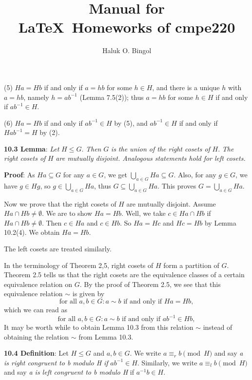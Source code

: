 \documentclass[11pt]{amsbook}
\title{
	Manual for\\
	\LaTeX\ Homeworks of cmpe220\\
	{\footnotesize \hbTimeStamp}
}
\author{Haluk O. Bingol}
\date{}                                           %
\begin{document}

(5) $Ha=Hb$ if and only if $a = hb$ for some $h \in H$, and there is a unique $h$ with $a=hb$, namely $h=ab^{-1}$ (Lemma 7.5(2)); thus $a=hb$ for some $h \in H$ if and only if $ab^{-1} \in H$. \par

(6)  $Ha=Hb$ if and only if $ab^{-1} \in H$ by (5), and $ab^{-1} \in H$ if and only if $Hab^{-1} = H$ by (2).\par

\textbf{10.3 Lemma}: \textit{Let} $H \leqslant G$. \textit{Then} $G$ \textit{is the union of the right cosets of} $H$. \textit{The right cosets of} $H$ \textit{are mutually disjoint. Analogous statements hold for left cosets.}\par
\textbf{Proof}: As $Ha\subseteq G$ for any $a \in G$, we get $\bigcup_{a \in G} Ha\subseteq G$. Also, for any $g \in G$, we have $g \in Hg$, so $g \in \bigcup_{a \in G} Ha$, thus $G \subseteq \bigcup_{a \in G} Ha$. This proves $G = \bigcup_{a \in G} Ha$. \par
Now we prove that the right cosets of $H$ are mutually disjoint. Assume $Ha \cap  Hb \neq \emptyset$. We are to show $Ha=Hb$. Well, we take $c \in Ha \cap  Hb $ if $Ha \cap  Hb \neq \emptyset$. Then $c \in Ha$ and $c \in Hb$. So $Ha=Hc$ and $Hc=Hb$ by Lemma 10.2(4). We obtain $Ha=Hb$. \par
The left cosets are treated similarly. \par
In the terminology of Theorem 2,5, right cosets of $H$ form a partition of $G$. Theorem 2.5 tells us that the right cosets are the equivalence classes of a certain equivalence relation on $G$. By the proof of Theorem 2.5, we see that this equivalence relation $\sim$ is given by 
\[ \text{for all } a,b \in G: a \sim b \text{ if and only if } Ha = Hb,\]
which we can read as
\[ \text{for all } a,b \in G: a \sim b \text{ if and only if } ab^{-1} \in Hb,\]
It may be worth while to obtain Lemma 10.3 from this relation $\sim$ instead of obtaining the relation $\sim$ from Lemma 10.3.\par
\textbf{10.4 Definition}: Let $H \leqslant G$ and $a,b \in G$. We write $a \equiv_r b \pmod{H}$ and say \textit{a is right congruent to b modulo H if} $ab^{-1} \in H$. Similarly, we write $a \equiv_l b \pmod{H}$ and say \textit{a is left congruent to b modulo H} if $a^{-1}b \in H$.
\end{document}
